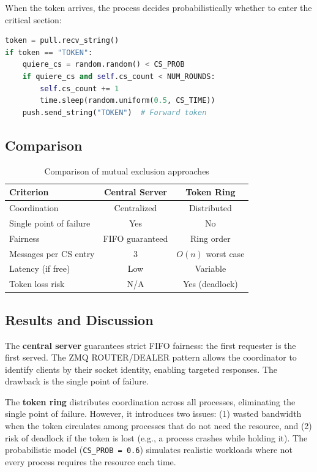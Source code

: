 \documentclass[12pt,a4paper]{article}
\begin{document}
When the token arrives, the process decides probabilistically whether to enter the critical section:

\begin{lstlisting}[language=Python, caption={Token handling and critical section}]
token = pull.recv_string()
if token == "TOKEN":
    quiere_cs = random.random() < CS_PROB
    if quiere_cs and self.cs_count < NUM_ROUNDS:
        self.cs_count += 1
        time.sleep(random.uniform(0.5, CS_TIME))
    push.send_string("TOKEN")  # Forward token
\end{lstlisting}

\subsection{Comparison}

\begin{table}[H]
\centering
\begin{tabular}{l c c}
\toprule
\textbf{Criterion} & \textbf{Central Server} & \textbf{Token Ring} \\
\midrule
Coordination & Centralized & Distributed \\
Single point of failure & Yes & No \\
Fairness & FIFO guaranteed & Ring order \\
Messages per CS entry & 3 & $O(n)$ worst case \\
Latency (if free) & Low & Variable \\
Token loss risk & N/A & Yes (deadlock) \\
\bottomrule
\end{tabular}
\caption{Comparison of mutual exclusion approaches}
\end{table}

\subsection{Results and Discussion}

The \textbf{central server} guarantees strict FIFO fairness: the first requester is the first served. The ZMQ ROUTER/DEALER pattern allows the coordinator to identify clients by their socket identity, enabling targeted responses. The drawback is the single point of failure.

The \textbf{token ring} distributes coordination across all processes, eliminating the single point of failure. However, it introduces two issues: (1) wasted bandwidth when the token circulates among processes that do not need the resource, and (2) risk of deadlock if the token is lost (e.g., a process crashes while holding it). The probabilistic model (\texttt{CS\_PROB = 0.6}) simulates realistic workloads where not every process requires the resource each time.
\end{document}
